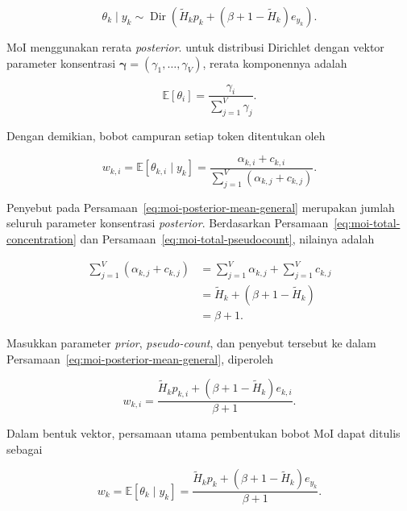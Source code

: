 \begin{equation}
\boxed{
\theta_k\mid y_k
\sim
\operatorname{Dir}
\left(
\widetilde H_kp_k
+
\left(\beta+1-\widetilde H_k\right)e_{y_k}
\right)
}.
\label{eq:moi-posterior-expanded}
\end{equation}

MoI menggunakan rerata \textit{posterior}. untuk distribusi Dirichlet dengan vektor parameter konsentrasi $\boldsymbol{\gamma}=(\gamma_1,\ldots,\gamma_V)$, rerata komponennya adalah

\begin{equation}
\mathbb{E}[\theta_i]
=
\frac{\gamma_i}{\sum_{j=1}^{V}\gamma_j}.
\label{eq:dirichlet-mean-general}
\end{equation}

Dengan demikian, bobot campuran setiap token ditentukan oleh

\begin{equation}
w_{k,i}
=
\mathbb{E}[\theta_{k,i}\mid y_k]
=
\frac{\alpha_{k,i}+c_{k,i}}
{\displaystyle\sum_{j=1}^{V}
\left(\alpha_{k,j}+c_{k,j}\right)}.
\label{eq:moi-posterior-mean-general}
\end{equation}

Penyebut pada Persamaan~\eqref{eq:moi-posterior-mean-general} merupakan jumlah seluruh parameter konsentrasi \textit{posterior}. Berdasarkan Persamaan~\eqref{eq:moi-total-concentration} dan Persamaan~\eqref{eq:moi-total-pseudocount}, nilainya adalah

\begin{align}
\sum_{j=1}^{V}
\left(\alpha_{k,j}+c_{k,j}\right)
&=
\sum_{j=1}^{V}\alpha_{k,j}
+
\sum_{j=1}^{V}c_{k,j} \\
&=
\widetilde H_k
+
\left(\beta+1-\widetilde H_k\right) \\
&=
\beta+1.
\label{eq:moi-posterior-denominator}
\end{align}

Masukkan parameter \textit{prior}, \textit{pseudo-count}, dan penyebut tersebut ke dalam Persamaan~\eqref{eq:moi-posterior-mean-general}, diperoleh

\begin{equation}
w_{k,i}
=
\frac{
\widetilde H_kp_{k,i}
+
\left(\beta+1-\widetilde H_k\right)e_{k,i}
}{
\beta+1
}.
\label{eq:moi-weight-component}
\end{equation}

Dalam bentuk vektor, persamaan utama pembentukan bobot MoI dapat ditulis sebagai \citep{moi}

\begin{equation}
\boxed{
w_k
=
\mathbb{E}[\theta_k\mid y_k]
=
\frac{
\widetilde H_kp_k
+
\left(\beta+1-\widetilde H_k\right)e_{y_k}
}{
\beta+1
}
}.
\label{eq:moi-weight}
\end{equation}

